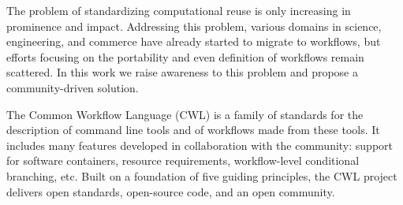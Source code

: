 {{The problem of standardizing computational reuse is only increasing in prominence and impact. Addressing this problem, various domains in science, engineering, and commerce have already started to migrate to workflows, but efforts focusing on the portability and even definition of workflows remain scattered. In this work we raise awareness to this problem and propose a community-driven solution.

The Common Workflow Language (CWL) is a family of standards for the description of command line tools and of workflows made from these tools. It includes many features developed in collaboration with the community: support for software containers, resource requirements, workflow-level conditional branching, etc. Built on a foundation of five guiding principles, the CWL project delivers open standards, open-source code, and an open community.

}}
